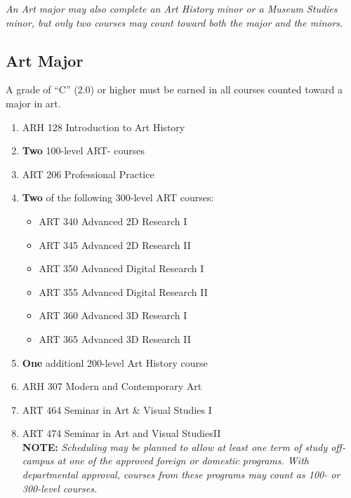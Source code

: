\documentclass[
  letterpaper,
]{scrbook}
\providecommand{\tightlist}{%
  \setlength{\itemsep}{0pt}\setlength{\parskip}{0pt}}
\begin{document}
\emph{An Art major may also complete an Art History minor or a Museum
Studies minor, but only two courses may count toward both the major and
the minors.}

\subsection{Art Major}\label{art-major}

A grade of ``C'' (2.0) or higher must be earned in all courses counted
toward a major in art.

\begin{enumerate}
\def\labelenumi{\arabic{enumi}.}
\item
  ARH 128 Introduction to Art History\\
\item
  \textbf{Two} 100-level ART- courses\\
\item
  ART 206 Professional Practice\\
\item
  \textbf{Two} of the following 300-level ART courses:

  \begin{itemize}
  \tightlist
  \item
    ART 340 Advanced 2D Research I\\
  \item
    ART 345 Advanced 2D Research II\\
  \item
    ART 350 Advanced Digital Research I\\
  \item
    ART 355 Advanced Digital Research II\\
  \item
    ART 360 Advanced 3D Research I\\
  \item
    ART 365 Advanced 3D Research II\\
  \end{itemize}
\item
  \textbf{One} additionl 200-level Art History course\\
\item
  ARH 307 Modern and Contemporary Art\\
\item
  ART 464 Seminar in Art \& Visual Studies I\\
\item
  ART 474 Seminar in Art and Visual StudiesII\\
  \textbf{NOTE:} \emph{Scheduling may be planned to allow at least one
  term of study off-campus at one of the approved foreign or domestic
  programs. With departmental approval, courses from these programs may
  count as 100- or 300-level courses.}
\end{enumerate}
\end{document}
